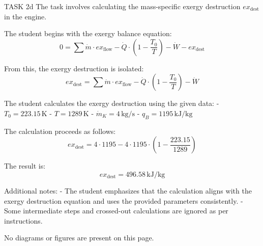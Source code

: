 TASK 2d  
The task involves calculating the mass-specific exergy destruction \( ex_{\text{dest}} \) in the engine.  

The student begins with the exergy balance equation:  
\[
0 = \sum \dot{m} \cdot ex_{\text{flow}} - \dot{Q} \cdot \left( 1 - \frac{T_0}{T} \right) - \dot{W} - ex_{\text{dest}}
\]  

From this, the exergy destruction is isolated:  
\[
ex_{\text{dest}} = \sum \dot{m} \cdot ex_{\text{flow}} - \dot{Q} \cdot \left( 1 - \frac{T_0}{T} \right) - \dot{W}
\]  

The student calculates the exergy destruction using the given data:  
- \( T_0 = 223.15 \, \text{K} \)  
- \( T = 1289 \, \text{K} \)  
- \( \dot{m}_K = 4 \, \text{kg/s} \)  
- \( q_B = 1195 \, \text{kJ/kg} \)  

The calculation proceeds as follows:  
\[
ex_{\text{dest}} = 4 \cdot 1195 - 4 \cdot 1195 \cdot \left( 1 - \frac{223.15}{1289} \right)
\]  

The result is:  
\[
ex_{\text{dest}} = 496.58 \, \text{kJ/kg}
\]  

Additional notes:  
- The student emphasizes that the calculation aligns with the exergy destruction equation and uses the provided parameters consistently.  
- Some intermediate steps and crossed-out calculations are ignored as per instructions.  

No diagrams or figures are present on this page.